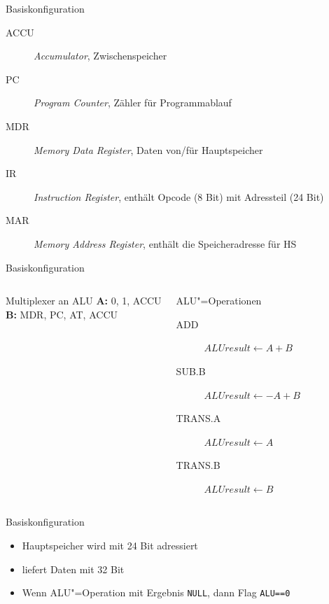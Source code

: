 \documentclass{beamer}
\begin{document}
\begin{frame}{Basiskonfiguration}

\begin{description}
    \item[ACCU] \emph{Accumulator}, Zwischenspeicher
    \item[PC] \emph{Program Counter}, Zähler für Programmablauf
    \item[MDR] \emph{Memory Data Register}, Daten von/für Hauptspeicher
    \item[IR] \emph{Instruction Register}, enthält Opcode (8 Bit) mit Adressteil (24 Bit)
    \item[MAR] \emph{Memory Address Register}, enthält die Speicheradresse für HS
\end{description}

\end{frame}



\begin{frame}{Basiskonfiguration}

\begin{columns}[l]
    \begin{block}{Multiplexer an ALU}
        \textbf{A:} 0, 1, ACCU\\
        \textbf{B:} MDR, PC, AT, ACCU
    \end{block}

    \pause
    \begin{block}{ALU"=Operationen}
        \begin{description}
            \item[ADD] $ALUresult \gets A + B$
            \item[SUB.B] $ALUresult \gets -A + B$
            \item[TRANS.A] $ALUresult \gets A$
            \item[TRANS.B] $ALUresult \gets B$
        \end{description}
    \end{block}
\end{columns}

\end{frame}



\begin{frame}{Basiskonfiguration}

\begin{itemize}
    \item Hauptspeicher wird mit 24 Bit adressiert
    \item liefert Daten mit 32 Bit
\end{itemize}

\pause

\begin{itemize}
    \item Wenn ALU"=Operation mit Ergebnis \texttt{NULL}, dann Flag \texttt{ALU==0}
\end{itemize}

\end{frame}
\end{document}
